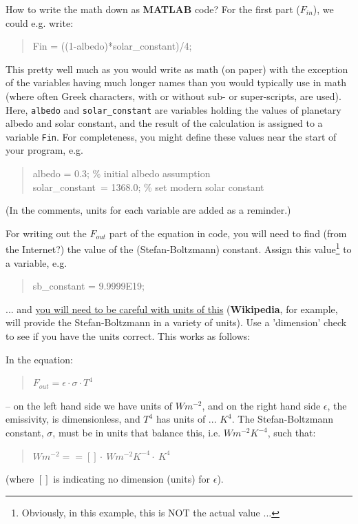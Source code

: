 \documentclass{tufte-book} %
\newenvironment{docspec}{\begin{quotation}\ttfamily\parskip0pt\parindent0pt\ignorespaces}{\end{quotation}}
\newenvironment{docspecnormal}{\begin{quotation}\ttfamily\normalsize\parskip0pt\parindent0pt\ignorespaces}{\end{quotation}}
\begin{document}
\noindent How to write the math down as \textbf{MATLAB} code? For the first part (\(F_{in}\)), we could e.g. write:
\begin{docspec}
Fin = ((1-albedo)*solar\_constant)/4;
\end{docspec}
This pretty well much as you would write as math (on paper) with the exception of the variables having much longer names than you would typically use in math (where often Greek characters, with or without sub- or super-scripts, are used). Here, \texttt{albedo} and \texttt{solar\_constant} are variables holding the values of planetary albedo and solar constant, and the result of the calculation is assigned to a variable \texttt{Fin}. For completeness, you might define these values near the start of your program, e.g.
\begin{docspec}
albedo = 0.3; \textcolor[rgb]{0,0.501961,0}{\% initial albedo assumption}\\
solar\_constant\ = 1368.0; \textcolor[rgb]{0,0.501961,0}{\% set modern solar constant}\\
\end{docspec}
(In the comments, units for each variable are added as a reminder.)
\vspace{1mm}

\noindent For writing out the \(F_{out}\) part of the equation in code, you will need to find (from the Internet?) the value of the (Stefan-Boltzmann) constant. Assign this value\footnote{Obviously, in this example, this is NOT the actual value ...} to a variable, e.g.
\begin{docspec}
sb\_constant = 9.9999E19;
\end{docspec}

\noindent ... and \uline{you will need to be careful with units of this} (\textbf{Wikipedia}, for example, will provide the Stefan-Boltzmann in a variety of units). Use a 'dimension' check to see if you have the units correct. This works as follows:

In the equation:
\begin{docspecnormal}
\(F_{out} = \epsilon \cdot \sigma \cdot T^{4}\)
\end{docspecnormal}
-- on the left hand side we have units of \(W m^{-2}\), and on the right hand side \(\epsilon\), the emissivity, is dimensionless, and \(T^{4}\) has units of ... \(K^{4}\). The Stefan-Boltzmann constant, \(\sigma\), must be in units that balance this, i.e. \(W m^{-2} K^{-4}\), such that:
\begin{docspecnormal}
\(W m^{-2} == [] \cdot\ W m^{-2} K^{-4} \cdot\ K^{4}\)
\end{docspecnormal}
(where \([]\) is indicating no dimension (units) for \(\epsilon\)).
\end{document}
